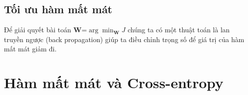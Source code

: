 \subsection{Tối ưu hàm mất mát}
Để giải quyết bài toán $\textbf{W}$=$\arg\min_{\textbf{W}} J$ chúng ta có một thuật toán là lan truyền ngược (back propagation) giúp ta điều chỉnh trọng số để giá trị của hàm mất mát giảm đi.

%
%    

\section{Hàm mất mát và Cross-entropy}
